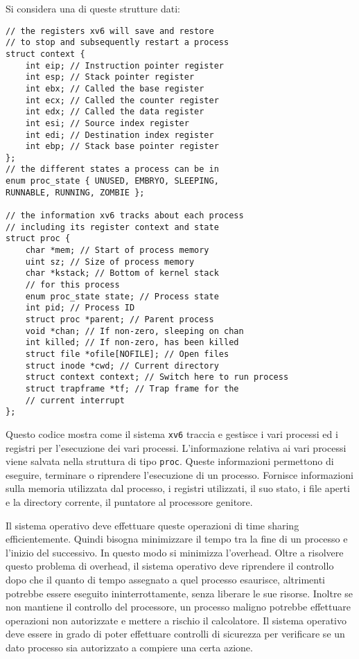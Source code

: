 \documentclass{article}
\numberwithin{equation}{subsection}
\begin{document}
Si considera una di queste strutture dati:
\begin{verbatim}
// the registers xv6 will save and restore
// to stop and subsequently restart a process
struct context {
	int eip; // Instruction pointer register
	int esp; // Stack pointer register
	int ebx; // Called the base register
	int ecx; // Called the counter register
	int edx; // Called the data register
	int esi; // Source index register
	int edi; // Destination index register
	int ebp; // Stack base pointer register
};
// the different states a process can be in
enum proc_state { UNUSED, EMBRYO, SLEEPING,
RUNNABLE, RUNNING, ZOMBIE };

// the information xv6 tracks about each process
// including its register context and state
struct proc {
	char *mem; // Start of process memory
	uint sz; // Size of process memory
	char *kstack; // Bottom of kernel stack
	// for this process
	enum proc_state state; // Process state
	int pid; // Process ID
	struct proc *parent; // Parent process
	void *chan; // If non-zero, sleeping on chan
	int killed; // If non-zero, has been killed
	struct file *ofile[NOFILE]; // Open files
	struct inode *cwd; // Current directory
	struct context context; // Switch here to run process
	struct trapframe *tf; // Trap frame for the
	// current interrupt
};
\end{verbatim}

Questo codice mostra come il sistema \verb|xv6| traccia e gestisce i vari processi ed i registri per l'esecuzione dei vari processi. L'informazione relativa ai 
vari processi viene salvata nella struttura di tipo \verb|proc|. Queste informazioni permettono di eseguire, terminare o riprendere l'esecuzione di un processo. Fornisce 
informazioni sulla memoria utilizzata dal processo, i registri utilizzati, il suo stato, i file aperti e la directory corrente, il puntatore al processore genitore. 



Il sistema operativo deve effettuare queste operazioni di time sharing efficientemente. Quindi bisogna minimizzare il tempo tra la fine di un processo e l'inizio del 
successivo. In questo modo si minimizza l'overhead. Oltre a risolvere questo problema di overhead, il sistema operativo deve riprendere il controllo dopo che il quanto 
di tempo assegnato a quel processo esaurisce, altrimenti potrebbe essere eseguito ininterrottamente, senza liberare le sue risorse. Inoltre se non mantiene il controllo 
del processore, un processo maligno potrebbe effettuare operazioni non autorizzate e mettere a rischio il calcolatore. Il sistema operativo deve essere in grado di 
poter effettuare controlli di sicurezza per verificare se un dato processo sia autorizzato a compiere una certa azione. 
\end{document}
